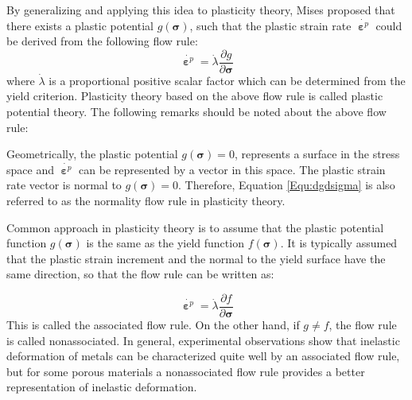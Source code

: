 By generalizing and applying this idea to plasticity theory, Mises proposed that there exists a plastic potential $g(\bm{\sigma})$, such that the plastic strain rate $\dot{{\bm{\upepsilon }}^p}$ could be derived from the following flow rule:
\begin{equation}
\dot{{\bm{\upepsilon }}^p} = \dot\lambda \frac{\partial g}{\partial \bm{\sigma}}
\label{Equ:dgdsigma}
\end{equation}
where $\dot\lambda$ is a proportional positive scalar factor which can be determined from the yield criterion. Plasticity theory based on the above flow rule is called plastic potential theory.
The following remarks should be noted about the above flow rule:

Geometrically, the plastic potential $g(\bm{\sigma})=0$, represents a surface in the stress space and $\dot{{\bm{\upepsilon }}^p}$ can be represented by a vector in this space.
The plastic strain rate vector is normal to $g(\bm{\sigma})=0$.
Therefore, Equation \ref{Equ:dgdsigma} is also referred to as the normality flow rule in plasticity theory.

Common approach in plasticity theory is to assume that the plastic potential function $g(\bm{\sigma})$ is the same as the yield function $f(\bm{\sigma})$.
It is typically assumed that the plastic strain increment and the normal to the yield surface have the same direction, so that the flow rule can be written as:


\begin{equation}
\dot{{\bm{\upepsilon }}^p} = \dot\lambda \frac{\partial f}{\partial \bm{\sigma}}
\end{equation}
This is called the associated flow rule.
On the other hand, if $g \neq f$, the flow rule is called nonassociated.
In general, experimental observations show that inelastic deformation of metals can be characterized quite well by an associated flow rule, but for some porous materials a nonassociated flow rule provides a better representation of inelastic deformation.

